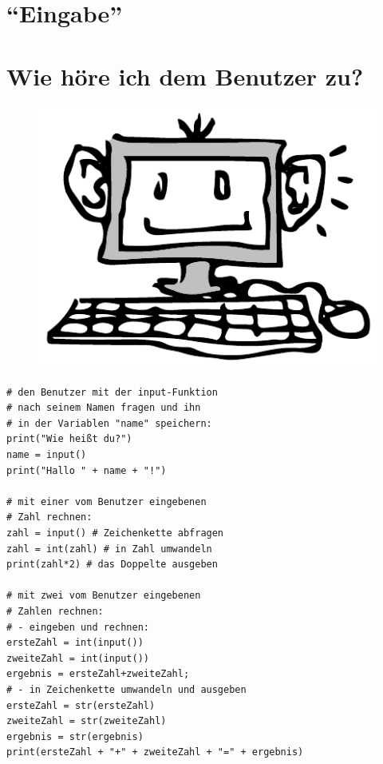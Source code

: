 



	\begin{center}
		\section*{\enquote{Eingabe}}
		\section*{Wie höre ich dem Benutzer zu?}	
	\end{center}
	
	\paragraph*{}
	\paragraph*{}
	
	\begin{figure}[htbp]
		\centering
		\includegraphics[width=1\textwidth]{img/eingabe.pdf}
		\label{eingabe}
	\end{figure}
	
	
	\newpage
	
	\paragraph*{}
	\begin{lstlisting}
# den Benutzer mit der input-Funktion 
# nach seinem Namen fragen und ihn
# in der Variablen "name" speichern:
print("Wie heißt du?")
name = input()
print("Hallo " + name + "!")

# mit einer vom Benutzer eingebenen
# Zahl rechnen:
zahl = input() # Zeichenkette abfragen
zahl = int(zahl) # in Zahl umwandeln
print(zahl*2) # das Doppelte ausgeben

# mit zwei vom Benutzer eingebenen
# Zahlen rechnen:
# - eingeben und rechnen:
ersteZahl = int(input())
zweiteZahl = int(input())
ergebnis = ersteZahl+zweiteZahl;
# - in Zeichenkette umwandeln und ausgeben
ersteZahl = str(ersteZahl)
zweiteZahl = str(zweiteZahl)
ergebnis = str(ergebnis)
print(ersteZahl + "+" + zweiteZahl + "=" + ergebnis)
	\end{lstlisting}
	
	
	
